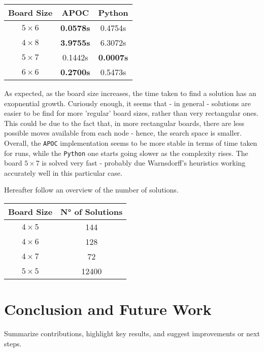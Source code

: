 \documentclass[conference]{IEEEtran}
\begin{document}
\begin{table}[ht]
\centering
\begin{tabular}{|c|c c|}
\hline
\textbf{Board Size} & \textbf{APOC} & \textbf{Python} \\ \hline
\textbf{$5 \times 6$} & \textbf{0.0578s} & 0.4754s \\ \hline
\textbf{$4 \times 8$} & \textbf{3.9755s} & 6.3072s \\ \hline
\textbf{$5 \times 7$} & 0.1442s & \textbf{0.0007s} \\ \hline
\textbf{$6 \times 6$} & \textbf{0.2700s} & 0.5473s \\ \hline
\end{tabular}
\end{table}

As expected, as the board size increases, the time taken to find a solution has an exopnential growth.
Curiously enough, it seems that - in general - solutions are easier to be find for more 'regular' board sizes, rather than very rectangular ones.
This could be due to the fact that, in more rectangular boards, there are less possible moves available from each node - hence, the search space is smaller.
Overall, the \texttt{APOC} implementation seems to be more stable in terms of time taken for runs, while the \texttt{Python} one starts going slower as the complexity rises.
The board $5 \times 7$ is solved very fast - probably due Warnsdorff's heuristics working accurately well in this particular case.

Hereafter follow an overview of the number of solutions.

\begin{table}[ht]
	\centering
	\begin{tabular}{|c|c|}
		\hline
		\textbf{Board Size} & \textbf{N° of Solutions} \\ \hline
		\textbf{$4 \times 5$} & 144	\\ \hline
		\textbf{$4 \times 6$} & 128	\\ \hline
		\textbf{$4 \times 7$} & 72  \\ \hline
		\textbf{$5 \times 5$} & 12400 \\ \hline 
	\end{tabular}
\end{table}

\section{Conclusion and Future Work}
Summarize contributions, highlight key results, and suggest improvements or next steps.
\end{document}
